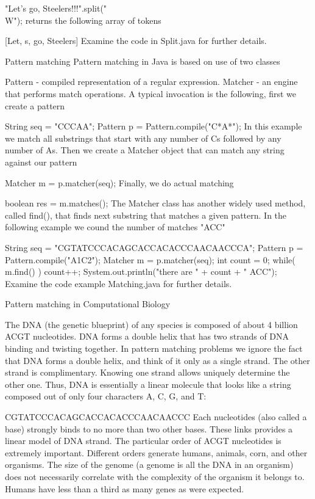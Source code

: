 "Let's go, Steelers!!!".split("\\W");
returns the following array of tokens

[Let, s, go, Steelers]
Examine the code in Split.java for further details.

Pattern matching
Pattern matching in Java is based on use of two classes

Pattern - compiled representation of a regular expression.
Matcher - an engine that performs match operations.
A typical invocation is the following, first we create a pattern

String seq = "CCCAA";
Pattern p = Pattern.compile("C*A*");
In this example we match all substrings that start with any number of Cs followed by any number of As. Then we create a Matcher object that can match any string against our pattern

Matcher m = p.matcher(seq);
Finally, we do actual matching

boolean res = m.matches();
The Matcher class has another widely used method, called find(), that finds next substring that matches a given pattern. In the following example we cound the number of matches "ACC"

String seq = "CGTATCCCACAGCACCACACCCAACAACCCA";
Pattern p = Pattern.compile("A{1}C{2}");
Matcher m = p.matcher(seq);
int count = 0;
while( m.find() ) count++;
System.out.println("there are " + count + " ACC");
Examine the code example Matching.java for further details.

Pattern matching in Computational Biology


The DNA (the genetic blueprint) of any species is composed of about 4 billion ACGT nucleotides. DNA forms a double helix that has two strands of DNA binding and twisting together. In pattern matching problems we ignore the fact that DNA forms a double helix, and think of it only as a single strand. The other strand is complimentary. Knowing one strand allows uniquely determine the other one. Thus, DNA is essentially a linear molecule that looks like a string composed out of only four characters A, C, G, and T:

CGTATCCCACAGCACCACACCCAACAACCC
Each nucleotides (also called a base) strongly binds to no more than two other bases. These links provides a linear model of DNA strand. The particular order of ACGT nucleotides is extremely important. Different orders generate humans, animals, corn, and other organisms. The size of the genome (a genome is all the DNA in an organism) does not necessarily correlate with the complexity of the organism it belongs to. Humans have less than a third as many genes as were expected.

